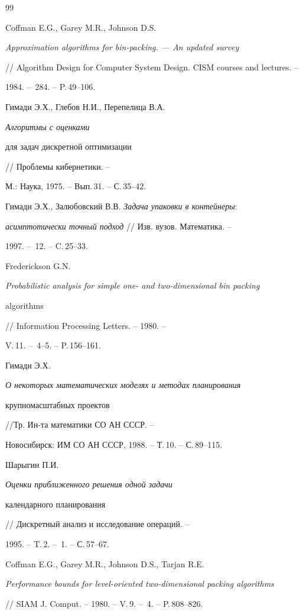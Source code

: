 \begin{thebibliography}{99}




Coffman E.G., Garey M.R., Johnson D.S.


{\em Approximation algorithms for bin-packing. --- An updated survey}


// Algorithm Design for Computer System Design. CISM courses and lectures. --


1984. -- \No\,284. -- P.\,49--106.




Гимади Э.Х., Глебов Н.И., Перепелица В.А. {\em Алгоритмы с оценками


для задач дискретной оптимизации} // Проблемы кибернетики. --


М.: Наука, 1975. -- Вып.\,31. -- С.\,35--42.




Гимади Э.Х., Залюбовский В.В. {\em Задача упаковки в контейнеры}:


{\em асимптотически точный подход} // Изв. вузов. Математика. --


1997. -- \No\,12. -- C.\,25--33.




Frederickson G.N.


{\em Probabilistic analysis for simple one- and two-dimensional bin packing


algorithms} // Information Processing Letters. -- 1980. --


V.\,11. -- \No\,4--5. -- P.\,156--161.




Гимади Э.Х. {\em О некоторых математических моделях и методах планирования


крупномасштабных проектов} //Тр. Ин-та математики СО АН СССР. -- 


Новосибирск: ИМ СО АН СССР, 1988. -- Т.\,10. -- С.\,89--115.




Шарыгин П.И. {\em Оценки приближенного решения одной задачи


календарного планирования} // Дискретный анализ и исследование операций. --


1995. -- T.\,2. -- \No\,1. -- С.\,57--67.




Coffman E.G., Garey M.R., Johnson D.S., Tarjan R.E. 


{\em Performance bounds for level-oriented two-dimensional packing algorithms}


// SIAM J. Comput. -- 1980. -- V.\,9. -- \No\,4. -- P.\,808--826.





\end{thebibliography} 


